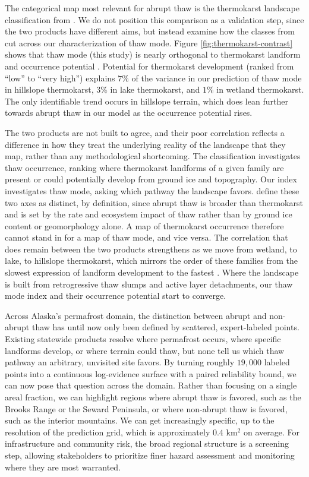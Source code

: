 \documentclass[../main.tex]{subfiles}
\begin{document}
The categorical map most relevant for abrupt thaw is the thermokarst landscape classification from . We do not position this comparison as a validation step, since the two products have different aims, but instead examine how the classes from  cut across our characterization of thaw mode. Figure \ref{fig:thermokarst-contrast} shows that thaw mode (this study) is nearly orthogonal to thermokarst landform and occurrence potential \citep{olefeldt2016circumpolar}. Potential for thermokarst development (ranked from ``low'' to ``very high'') explains $7\%$ of the variance in our prediction of thaw mode in hillslope thermokarst, $3\%$ in lake thermokarst, and $1\%$ in wetland thermokarst. The only identifiable trend occurs in hillslope terrain, which does lean further towards abrupt thaw in our model as the occurrence potential rises.

The two products are not built to agree, and their poor correlation reflects a difference in how they treat the underlying reality of the landscape that they map, rather than any methodological shortcoming. The  classification investigates thaw occurrence, ranking where thermokarst landforms of a given family are present or could potentially develop from ground ice and topography. Our index investigates thaw mode, asking which pathway the landscape favors.  define these two axes as distinct, by definition, since abrupt thaw is broader than thermokarst and is set by the rate and ecosystem impact of thaw rather than by ground ice content or geomorphology alone. A map of thermokarst occurrence therefore cannot stand in for a map of thaw mode, and vice versa. The correlation that does remain between the two products strengthens as we move from wetland, to lake, to hillslope thermokarst, which mirrors the order of these families from the slowest expression of landform development to the fastest \citep{webb2025review}. Where the  landscape is built from retrogressive thaw slumps and active layer detachments, our thaw mode index and their occurrence potential start to converge.

Across Alaska's permafrost domain, the distinction between abrupt and non-abrupt thaw has until now only been defined by scattered, expert-labeled points. Existing statewide products resolve where permafrost occurs, where specific landforms develop, or where terrain could thaw, but none tell us which thaw pathway an arbitrary, unvisited site favors. By turning roughly $19,000$ labeled points into a continuous log-evidence surface with a paired reliability bound, we can now pose that question across the domain. Rather than focusing on a single areal fraction, we can highlight regions where abrupt thaw is favored, such as the Brooks Range or the Seward Peninsula, or where non-abrupt thaw is favored, such as the interior mountains. We can get increasingly specific, up to the resolution of the prediction grid, which is approximately $0.4$ km$^2$ on average. For infrastructure and community risk, the broad regional structure is a screening step, allowing stakeholders to prioritize finer hazard assessment and monitoring where they are most warranted.
\end{document}
